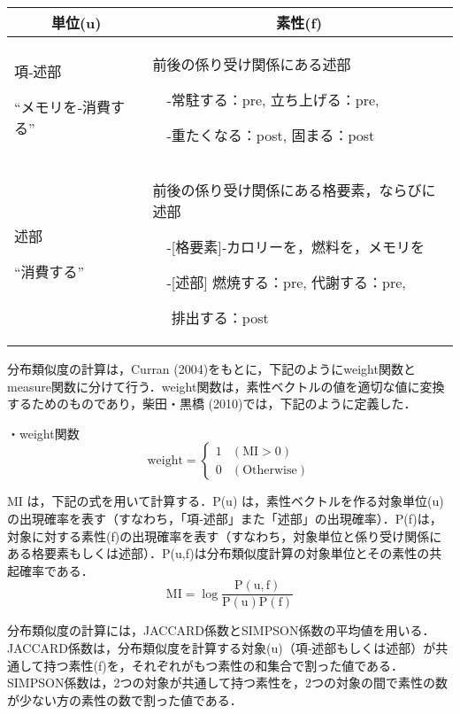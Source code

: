 \documentclass[japanese]{jnlp_1.4}
\begin{document}
\vspace{0.5\Cvs}
\begin{center}
\begin{tabular}{p{}|p{}}
\hline
\multicolumn{1}{c|}{単位(u)} & \multicolumn{1}{c}{素性(f)} \\
\hline
項‐述部 \par ``メモリを‐消費する''& 
前後の係り受け関係にある述部 \par 　-常駐する：pre, 立ち上げる：pre, \par 　-重たくなる：post, 固まる：post \\
\hline
述部 \par ``消費する''& 
前後の係り受け関係にある格要素，ならびに述部 \par 　-[格要素]‐カロリーを，燃料を，メモリを \par 　-[述部] 燃焼する：pre, 代謝する：pre, \par 　\phantom{-[述部]} 排出する：post \\
\hline
\end{tabular}
\end{center}
\vspace{1\Cvs}

分布類似度の計算は，Curran (2004)をもとに，下記のようにweight関数とmeasure関数に分けて行う．weight関数は，素性ベクトルの値を適切な値に変換するためのものであり，柴田・黒橋 (2010)では，下記のように定義した．

・weight関数
\[
 \text{weight} = \begin{cases}
	1 & (\text{MI} > 0) \\
	0 & (\text{Otherwise})
 \end{cases}
\]

MI は，下記の式を用いて計算する．P(u) は，素性ベクトルを作る対象単位(u)の出現確率を表す（すなわち，「項‐述部」また「述部」の出現確率）．P(f)は，対象に対する素性(f)の出現確率を表す（すなわち，対象単位と係り受け関係にある格要素もしくは述部）．P(u,f)は分布類似度計算の対象単位とその素性の共起確率である．
\[
 \text{MI} = \log \frac{\mathrm{P(u,f)}}{\mathrm{P(u)P(f)}}
\]

分布類似度の計算には，JACCARD係数とSIMPSON係数の平均値を用いる．JACCARD係数は，分布類似度を計算する対象(u)（項‐述部もしくは述部）が共通して持つ素性(f)を，それぞれがもつ素性の和集合で割った値である．SIMPSON係数は，2つの対象が共通して持つ素性を，2つの対象の間で素性の数が少ない方の素性の数で割った値である．
\end{document}
